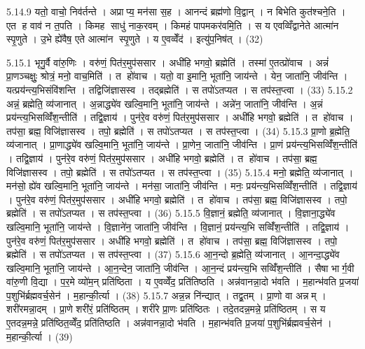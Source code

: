 5.14.9
यतो॒ वाचो॒ निव॑र्तन्ते । अप्राप्य॒ मन॑सा स॒ह । आनन्दं ब्रह्म॑णो वि॒द्वान् । न बिभेति कुत॑श्चने॒ति । एत ह वाव॑ न त॒पति । किमह साधु॑ नाक॒रवम् । किमहं पापमकर॑वमि॒ति । स य एवव्विँद्वानेते आत्मा॑न स्पृ॒णुते । उ॒भे ह्ये॑वैष॒ एते आत्मा॑न स्पृ॒णुते । य ए॒वव्वेँद॑ । इत्यु॑प॒निष॑त् । (32)


\setcounter{anuvakam}{0}

5.15.1
भृगु॒र्वै वा॑रु॒णिः । वरु॑णं॒ पित॑र॒मुप॑ससार । अधी॑हि भगवो॒ ब्रह्मेति॑ । तस्मा॑ ए॒तत्प्रो॑वाच । अन्नं॑ प्रा॒णञ्चक्षुः॒ श्रोत्रं॒ मनो॒ वाच॒मिति॑ । त हो॑वाच । यतो॒ वा इ॒मानि॒ भूता॑नि॒ जाय॑न्ते । येन॒ जाता॑नि॒ जीव॑न्ति । यत्प्रय॑न्त्य॒भिसंवि॑शन्ति । तद्विजि॑ज्ञासस्व । तद्ब्रह्मेति॑ । स तपो॑ऽतप्यत । स तप॑स्त॒प्त्वा । (33)
5.15.2
अन्नं॒ ब्रह्मेति॒ व्य॑जानात् । अ॒न्नाद्ध्ये॑व खल्वि॒मानि॒ भूता॑नि॒ जाय॑न्ते । अन्ने॑न॒ जाता॑नि॒ जीव॑न्ति । अ॒न्नं प्रय॑न्त्य॒भिसव्विँ॑श॒न्तीति॑ । तद्वि॒ज्ञाय॑ । पुन॑रे॒व वरु॑णं॒ पित॑र॒मुप॑ससार । अधी॑हि भगवो॒ ब्रह्मेति॑ । त हो॑वाच । तप॑सा॒ ब्रह्म॒ विजि॑ज्ञासस्व । तपो॒ ब्रह्मेति॑ । स तपो॑ऽतप्यत । स तप॑स्त॒प्त्वा । (34)
5.15.3
प्रा॒णो ब्र॒ह्मेति॒ व्य॑जानात् । प्रा॒णाद्ध्ये॑व खल्वि॒मानि॒ भूता॑नि॒ जाय॑न्ते । प्रा॒णेन॒ जाता॑नि॒ जीव॑न्ति । प्रा॒णं प्रय॑न्त्य॒भिसव्विँ॑श॒न्तीति॑ । तद्वि॒ज्ञाय॑ । पुन॑रे॒व वरु॑णं॒ पित॑र॒मुप॑ससार । अधी॑हि भगवो॒ ब्रह्मेति॑ । त हो॑वाच । तप॑सा॒ ब्रह्म॒ विजि॑ज्ञासस्व । तपो॒ ब्रह्मेति॑ । स तपो॑ऽतप्यत । स तप॑स्त॒प्त्वा । (35)
5.15.4
मनो॒ ब्रह्मेति॒ व्य॑जानात् । मन॑सो॒ ह्ये॑व खल्वि॒मानि॒ भूता॑नि॒ जाय॑न्ते । मन॑सा॒ जाता॑नि॒ जीव॑न्ति । मनः॒ प्रय॑न्त्य॒भिसव्विँ॑श॒न्तीति॑ । तद्वि॒ज्ञाय॑ । पुन॑रे॒व वरु॑णं॒ पित॑र॒मुप॑ससार । अधी॑हि भगवो॒ ब्रह्मेति॑ । त हो॑वाच । तप॑सा॒ ब्रह्म॒ विजि॑ज्ञासस्व । तपो॒ ब्रह्मेति॑ । स तपो॑ऽतप्यत । स तप॑स्त॒प्त्वा । (36)
5.15.5
वि॒ज्ञानं॒ ब्रह्मेति॒ व्य॑जानात् । वि॒ज्ञाना॒द्ध्ये॑व खल्वि॒मानि॒ भूता॑नि॒ जाय॑न्ते । वि॒ज्ञाने॑न॒ जाता॑नि॒ जीव॑न्ति । वि॒ज्ञानं॒ प्रय॑न्त्य॒भि सव्विँ॑श॒न्तीति॑ । तद्वि॒ज्ञाय॑ । पुन॑रे॒व वरु॑णं॒ पित॑र॒मुप॑ससार । अधी॑हि भगवो॒ ब्रह्मेति॑ । त हो॑वाच । तप॑सा॒ ब्रह्म॒ विजि॑ज्ञासस्व । तपो॒ ब्रह्मेति॑ । स तपो॑ऽतप्यत । स तप॑स्त॒प्त्वा । (37)
5.15.6
आ॒न॒न्दो ब्र॒ह्मेति॒ व्य॑जानात् । आ॒नन्दा॒द्ध्ये॑व खल्वि॒मानि॒ भूता॑नि॒ जाय॑न्ते । आ॒न॒न्देन॒ जाता॑नि॒ जीव॑न्ति । आ॒न॒न्दं प्रय॑न्त्य॒भि सव्विँ॑श॒न्तीति॑ । सैषा भार्ग॒वी वा॑रु॒णी वि॒द्या । प॒र॒मे व्यो॑म॒न् प्रति॑ष्ठिता । य ए॒वव्वेँद॒ प्रति॑तिष्ठति । अन्न॑वानन्ना॒दो भ॑वति । म॒हान्भ॑वति प्र॒जया॑ प॒शुभि॑र्ब्रह्मवर्च॒सेन॑ । म॒हान्की॒र्त्या । (38)
5.15.7
अन्न॒न्न नि॑न्द्यात् । तद्व्र॒तम् । प्रा॒णो वा अन्नम् । शरी॑रमन्ना॒दम् । प्रा॒णे शरी॑रं॒ प्रति॑ष्ठितम् । शरी॑रे प्रा॒णः प्रति॑ष्ठितः । तदे॒तदन्न॒मन्ने॒ प्रति॑ष्ठितम् । स य ए॒तदन्न॒मन्ने॒ प्रति॑ष्ठित॒व्वेँद॒ प्रति॑तिष्ठति । अन्न॑वानन्ना॒दो भ॑वति । म॒हान्भ॑वति प्र॒जया॑ प॒शुभि॑र्ब्रह्मवर्च॒सेन॑ । म॒हान्की॒र्त्या । (39)
